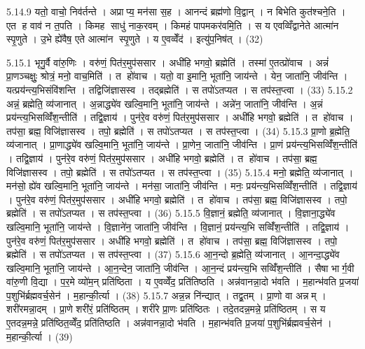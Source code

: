 5.14.9
यतो॒ वाचो॒ निव॑र्तन्ते । अप्राप्य॒ मन॑सा स॒ह । आनन्दं ब्रह्म॑णो वि॒द्वान् । न बिभेति कुत॑श्चने॒ति । एत ह वाव॑ न त॒पति । किमह साधु॑ नाक॒रवम् । किमहं पापमकर॑वमि॒ति । स य एवव्विँद्वानेते आत्मा॑न स्पृ॒णुते । उ॒भे ह्ये॑वैष॒ एते आत्मा॑न स्पृ॒णुते । य ए॒वव्वेँद॑ । इत्यु॑प॒निष॑त् । (32)


\setcounter{anuvakam}{0}

5.15.1
भृगु॒र्वै वा॑रु॒णिः । वरु॑णं॒ पित॑र॒मुप॑ससार । अधी॑हि भगवो॒ ब्रह्मेति॑ । तस्मा॑ ए॒तत्प्रो॑वाच । अन्नं॑ प्रा॒णञ्चक्षुः॒ श्रोत्रं॒ मनो॒ वाच॒मिति॑ । त हो॑वाच । यतो॒ वा इ॒मानि॒ भूता॑नि॒ जाय॑न्ते । येन॒ जाता॑नि॒ जीव॑न्ति । यत्प्रय॑न्त्य॒भिसंवि॑शन्ति । तद्विजि॑ज्ञासस्व । तद्ब्रह्मेति॑ । स तपो॑ऽतप्यत । स तप॑स्त॒प्त्वा । (33)
5.15.2
अन्नं॒ ब्रह्मेति॒ व्य॑जानात् । अ॒न्नाद्ध्ये॑व खल्वि॒मानि॒ भूता॑नि॒ जाय॑न्ते । अन्ने॑न॒ जाता॑नि॒ जीव॑न्ति । अ॒न्नं प्रय॑न्त्य॒भिसव्विँ॑श॒न्तीति॑ । तद्वि॒ज्ञाय॑ । पुन॑रे॒व वरु॑णं॒ पित॑र॒मुप॑ससार । अधी॑हि भगवो॒ ब्रह्मेति॑ । त हो॑वाच । तप॑सा॒ ब्रह्म॒ विजि॑ज्ञासस्व । तपो॒ ब्रह्मेति॑ । स तपो॑ऽतप्यत । स तप॑स्त॒प्त्वा । (34)
5.15.3
प्रा॒णो ब्र॒ह्मेति॒ व्य॑जानात् । प्रा॒णाद्ध्ये॑व खल्वि॒मानि॒ भूता॑नि॒ जाय॑न्ते । प्रा॒णेन॒ जाता॑नि॒ जीव॑न्ति । प्रा॒णं प्रय॑न्त्य॒भिसव्विँ॑श॒न्तीति॑ । तद्वि॒ज्ञाय॑ । पुन॑रे॒व वरु॑णं॒ पित॑र॒मुप॑ससार । अधी॑हि भगवो॒ ब्रह्मेति॑ । त हो॑वाच । तप॑सा॒ ब्रह्म॒ विजि॑ज्ञासस्व । तपो॒ ब्रह्मेति॑ । स तपो॑ऽतप्यत । स तप॑स्त॒प्त्वा । (35)
5.15.4
मनो॒ ब्रह्मेति॒ व्य॑जानात् । मन॑सो॒ ह्ये॑व खल्वि॒मानि॒ भूता॑नि॒ जाय॑न्ते । मन॑सा॒ जाता॑नि॒ जीव॑न्ति । मनः॒ प्रय॑न्त्य॒भिसव्विँ॑श॒न्तीति॑ । तद्वि॒ज्ञाय॑ । पुन॑रे॒व वरु॑णं॒ पित॑र॒मुप॑ससार । अधी॑हि भगवो॒ ब्रह्मेति॑ । त हो॑वाच । तप॑सा॒ ब्रह्म॒ विजि॑ज्ञासस्व । तपो॒ ब्रह्मेति॑ । स तपो॑ऽतप्यत । स तप॑स्त॒प्त्वा । (36)
5.15.5
वि॒ज्ञानं॒ ब्रह्मेति॒ व्य॑जानात् । वि॒ज्ञाना॒द्ध्ये॑व खल्वि॒मानि॒ भूता॑नि॒ जाय॑न्ते । वि॒ज्ञाने॑न॒ जाता॑नि॒ जीव॑न्ति । वि॒ज्ञानं॒ प्रय॑न्त्य॒भि सव्विँ॑श॒न्तीति॑ । तद्वि॒ज्ञाय॑ । पुन॑रे॒व वरु॑णं॒ पित॑र॒मुप॑ससार । अधी॑हि भगवो॒ ब्रह्मेति॑ । त हो॑वाच । तप॑सा॒ ब्रह्म॒ विजि॑ज्ञासस्व । तपो॒ ब्रह्मेति॑ । स तपो॑ऽतप्यत । स तप॑स्त॒प्त्वा । (37)
5.15.6
आ॒न॒न्दो ब्र॒ह्मेति॒ व्य॑जानात् । आ॒नन्दा॒द्ध्ये॑व खल्वि॒मानि॒ भूता॑नि॒ जाय॑न्ते । आ॒न॒न्देन॒ जाता॑नि॒ जीव॑न्ति । आ॒न॒न्दं प्रय॑न्त्य॒भि सव्विँ॑श॒न्तीति॑ । सैषा भार्ग॒वी वा॑रु॒णी वि॒द्या । प॒र॒मे व्यो॑म॒न् प्रति॑ष्ठिता । य ए॒वव्वेँद॒ प्रति॑तिष्ठति । अन्न॑वानन्ना॒दो भ॑वति । म॒हान्भ॑वति प्र॒जया॑ प॒शुभि॑र्ब्रह्मवर्च॒सेन॑ । म॒हान्की॒र्त्या । (38)
5.15.7
अन्न॒न्न नि॑न्द्यात् । तद्व्र॒तम् । प्रा॒णो वा अन्नम् । शरी॑रमन्ना॒दम् । प्रा॒णे शरी॑रं॒ प्रति॑ष्ठितम् । शरी॑रे प्रा॒णः प्रति॑ष्ठितः । तदे॒तदन्न॒मन्ने॒ प्रति॑ष्ठितम् । स य ए॒तदन्न॒मन्ने॒ प्रति॑ष्ठित॒व्वेँद॒ प्रति॑तिष्ठति । अन्न॑वानन्ना॒दो भ॑वति । म॒हान्भ॑वति प्र॒जया॑ प॒शुभि॑र्ब्रह्मवर्च॒सेन॑ । म॒हान्की॒र्त्या । (39)
